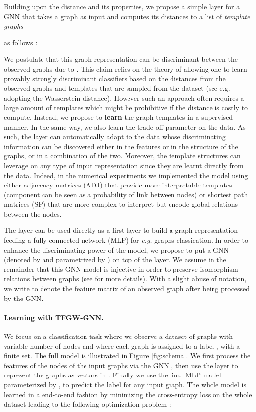 \documentclass{article}
\begin{document}
Building upon the  distance and its properties, we propose a simple layer for a GNN that takes a graph  as
input and computes its  distances to a list of  \emph{template graphs}

as follows :

We postulate that this graph representation can be discriminant between the observed graphs due to . This claim relies on the theory of \cite{balcan2008theory} allowing one to learn provably strongly
discriminant classifiers based on the distances from the observed graphs and templates that are sampled from the dataset 
(see e.g. \cite{rakotomamonjy2018distance}  adopting the Wasserstein distance). However such an approach often requires a large
amount of templates which might be prohibitive if the distance is costly to
compute. Instead, we propose to {\bf learn} the graph templates  in a supervised manner. In the same way, we also learn the trade-off parameter  on the data. As such, the  layer can
automatically adapt to the data whose
discriminating information can be discovered either in the features or in the structure of the graphs, or in a combination of the two. Moreover, the template structures can leverage on any type of input representation  since they are learnt directly from the data. Indeed, in the numerical experiments we implemented the model using either adjacency matrices (ADJ) that provide more interpretable templates (component  can be seen as a probability of link between nodes) or shortest path matrices (SP) that are more complex to interpret but encode global relations between the nodes. 
 

The  layer can be used directly as a first layer to build a graph representation feeding a fully connected network (MLP) 
for \textit{e.g.} graphs classication. In order to enhance the discriminating power of the model, we propose to put a GNN (denoted by  and parametrized by ) on top of the  layer. We assume in the remainder that this GNN model  is injective in order to preserve isomorphism relations between graphs (see \cite{xu2018powerful} for more details). With a slight abuse of notation, we write  to denote the feature matrix of an observed graph after being processed by the GNN. 






\paragraph{Learning with TFGW-GNN.} We focus on a classification
task where we observe a dataset  of  graphs
 with variable
number of nodes  and where each graph is assigned to a label , with
 a finite set. The full model is illustrated in
Figure \ref{fig:schema}. We first process the features of the nodes of the input graphs via the GNN
, then use the  layer to represent the graphs as
vectors in . Finally we use the final MLP model  parameterized by , to predict the label for any input graph. 
The whole model is learned in a end-to-end fashion by minimizing the cross-entropy loss on the whole
dataset leading to the following optimization problem :
\end{document}
